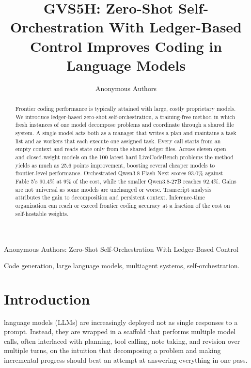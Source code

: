 \documentclass[journal]{IEEEtran}
\begin{document}
\title{GVS5H: Zero-Shot Self-Orchestration With Ledger-Based Control Improves Coding in
Language Models}

\author{Anonymous Authors}

%
{Anonymous Authors: Zero-Shot Self-Orchestration With Ledger-Based Control}

\maketitle

\begin{abstract}
Frontier coding performance is typically attained with large, costly proprietary models. We introduce ledger-based zero-shot self-orchestration, a training-free method in which fresh instances of one model decompose problems and coordinate through a shared file system.
A single model acts both as a manager that writes a plan and maintains a task list and as workers that each execute one assigned task. Every call starts from an empty context and reads state only from the shared ledger files.
Across eleven open and closed-weight models on the 100 latest hard LiveCodeBench problems
the method yields as much as 25.6 points improvement, boosting several cheaper models to frontier-level performance.
Orchestrated Qwen3.8 Flash Next scores 93.0\% against Fable 5's 90.4\% at 9\% of the cost, while the smaller Qwen3.8-27B reaches 92.4\%.
Gains are not universal as some models are unchanged or worse. Transcript analysis attributes the gain to decomposition and persistent context.
Inference-time organization can reach or exceed frontier coding accuracy at a fraction of the cost on self-hostable weights.
\end{abstract}

\begin{IEEEkeywords}
Code generation, large language models, multiagent systems, self-orchestration.
\end{IEEEkeywords}

\section{Introduction}
\label{sec:intro}

 language models (LLMs) are increasingly deployed not as single responses to a prompt. Instead, they are wrapped in a scaffold that performs multiple model calls, often interlaced with planning, tool calling, note taking,
and revision over multiple turns, on the intuition that decomposing a problem and making incremental progress should beat an attempt at answering everything in one pass.
\end{document}
